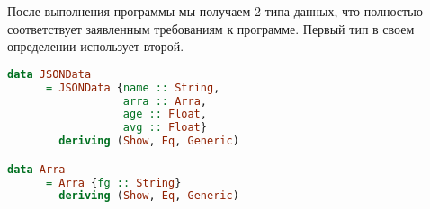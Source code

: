 После выполнения программы мы получаем 2 типа данных, что полностью соответствует заявленным требованиям к программе. Первый тип в своем определении использует второй. 

\begin{lstlisting}[language=Haskell]
data JSONData
      = JSONData {name :: String,
                  arra :: Arra,
                  age :: Float,
                  avg :: Float}
        deriving (Show, Eq, Generic)

data Arra
      = Arra {fg :: String}
        deriving (Show, Eq, Generic)            
\end{lstlisting}

\printbibliography[%
    heading=bibintoc%
]


